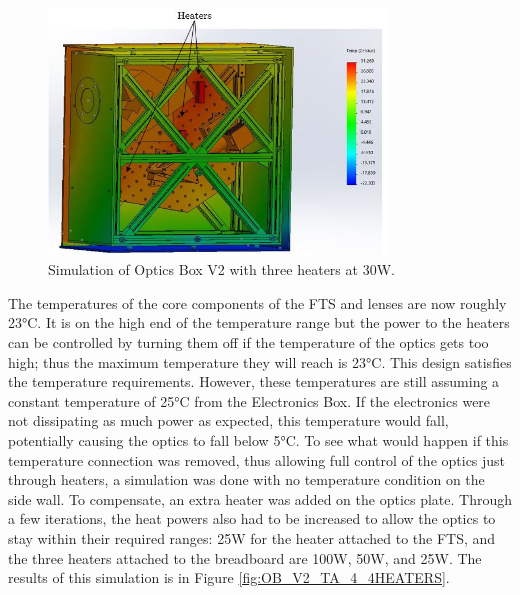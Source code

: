 \begin{figure}
    \centering
    \includegraphics[width=0.8\textwidth]{chap3_images/LIFE_V2_images/TA_25_-20_no_front_wall_three_heaters_labelled.JPG}
    \caption{Simulation of Optics Box V2 with three heaters at 30W.}
    \label{fig:OB_V2_TA_3_3HEATERS}
\end{figure}

The temperatures of the core components of the FTS and lenses are now roughly 23°C. It is on the high end of the temperature range but the power to the heaters can be controlled by turning them off if the temperature of the optics gets too high; thus the maximum temperature they will reach is 23°C. This design satisfies the temperature requirements. However, these temperatures are still assuming a constant temperature of 25°C from the Electronics Box. If the electronics were not dissipating as much power as expected, this temperature would fall, potentially causing the optics to fall below 5°C. To see what would happen if this temperature connection was removed, thus allowing full control of the optics just through heaters, a simulation was done with no temperature condition on the side wall. To compensate, an extra heater was added on the optics plate. Through a few iterations, the heat powers also had to be increased to allow the optics to stay within their required ranges: 25W for the heater attached to the FTS, and the three heaters attached to the breadboard are 100W, 50W, and 25W. The results of this simulation is in Figure \ref{fig:OB_V2_TA_4_4HEATERS}.

